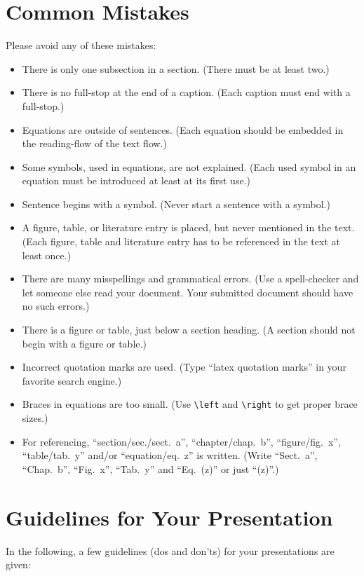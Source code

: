 \documentclass[journal]{IEEEtran}
\begin{document}
\section{Common Mistakes}

Please avoid any of these mistakes:
\begin{itemize}
\item There is only one subsection in a section. (There must be at least two.)
\item There is no full-stop at the end of a caption. (Each caption must end with a full-stop.)
\item Equations are outside of sentences. (Each equation should be embedded in the reading-flow of the text flow.)
\item Some symbols, used in equations, are not explained. (Each used symbol in an equation must be introduced at least at its first use.)
\item Sentence begins with a symbol. (Never start a sentence with a symbol.)
\item A figure, table, or literature entry is placed, but never mentioned in the text. (Each figure, table and literature entry has to be referenced in the text at least once.)
\item There are many misspellings and grammatical errors. (Use a spell-checker and let someone else read your document. Your submitted document should have no such errors.)
\item There is a figure or table, just below a section heading. (A section should not begin with a figure or table.)
\item Incorrect quotation marks are used. (Type “latex quotation marks” in your favorite search engine.)
\item Braces in equations are too small. (Use \texttt{\textbackslash{}left} and \texttt{\textbackslash{}right} to get proper brace sizes.)
\item For referencing, “section/sec./sect.~a”, “chapter/chap.~b”, “figure/fig.~x”, “table/tab.~y” and/or “equation/eq.~z” is written. (Write “Sect.~a”, “Chap.~b”, “Fig.~x”, “Tab.~y” and “Eq.~(z)” or just “(z)”.)
\end{itemize}


\section{Guidelines for Your Presentation}

In the following, a few guidelines (dos and don'ts) for your presentations are given:
\end{document}
